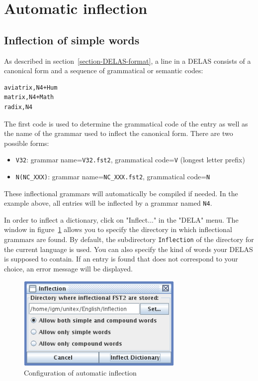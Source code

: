 \section{Automatic inflection}
\label{section-automatic-inflection}
\subsection{Inflection of simple words}

As described in section~\ref{section-DELAS-format}, a line in a DELAS
consists of a canonical form and a sequence of grammatical or semantic codes:

\begin{verbatim}
aviatrix,N4+Hum
matrix,N4+Math
radix,N4
\end{verbatim}

\bigskip
\noindent The first code is used to determine the grammatical code of the entry as
well as the name of the grammar used to inflect the canonical form. There are
two possible forms:

\begin{itemize}
  \item \verb+V32+: grammar name=\verb+V32.fst2+, grammatical code=\verb+V+
  (longest letter prefix)
  \item \verb+N(NC_XXX)+: grammar name=\verb+NC_XXX.fst2+, grammatical code=\verb+N+
\end{itemize}

\bigskip
\noindent These inflectional grammars  will automatically be
compiled if needed. In the example above, all entries will be inflected by a grammar named \verb+N4+.

\bigskip
\noindent In order to  inflect a dictionary, click on "Inflect..." in the "DELA" menu. The
window in figure~\ref{fig-inflection-configuration} allows you to specify the
directory in which inflectional grammars are found. By default, the subdirectory
\verb+Inflection+ of the directory for the current language is used. You can
also specify the kind of words your DELAS is supposed to contain. If an entry is
found that does not correspond to your choice, an error message will be
displayed.

\bigskip
\begin{figure}[h]
\begin{center}
\includegraphics[width=8cm]{resources/img/fig3-5.png}
\caption{Configuration of automatic inflection\label{fig-inflection-configuration}}
\end{center}
\end{figure}

